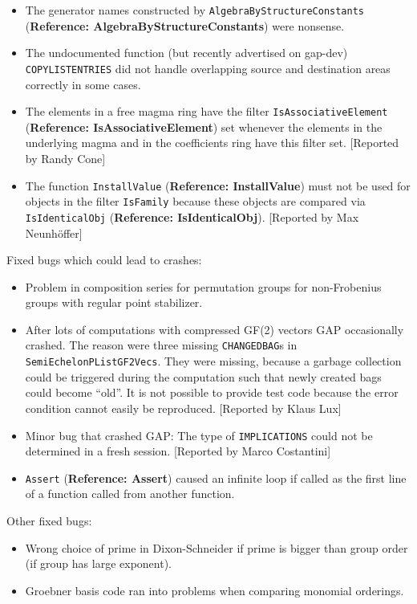 \documentclass[a4paper,11pt]{report}
\begin{document}
{{\begin{itemize}
was available. [Reported by Burkhard H{\"o}fling] 
\item  The generator names constructed by \texttt{AlgebraByStructureConstants} (\textbf{Reference: AlgebraByStructureConstants}) were nonsense. 
\item  The undocumented function (but recently advertised on gap-dev) \texttt{COPY{\textunderscore}LIST{\textunderscore}ENTRIES} did not handle overlapping source and destination areas correctly in some
cases. 
\item  The elements in a free magma ring have the filter \texttt{IsAssociativeElement} (\textbf{Reference: IsAssociativeElement}) set whenever the elements in the underlying magma and in the coefficients ring
have this filter set. [Reported by Randy Cone] 
\item  The function \texttt{InstallValue} (\textbf{Reference: InstallValue}) must not be used for objects in the filter \texttt{IsFamily} because these objects are compared via \texttt{IsIdenticalObj} (\textbf{Reference: IsIdenticalObj}). [Reported by Max Neunh{\"o}ffer] 
\end{itemize}
 Fixed bugs which could lead to crashes: 
\begin{itemize}
\item  Problem in composition series for permutation groups for non-Frobenius groups
with regular point stabilizer. 
\item  After lots of computations with compressed GF(2) vectors \textsf{GAP} occasionally crashed. The reason were three missing \texttt{CHANGED{\textunderscore}BAG}s in \texttt{SemiEchelonPListGF2Vecs}. They were missing, because a garbage collection could be triggered during
the computation such that newly created bags could become ``old''. It is not possible to provide test code because the error condition cannot
easily be reproduced. [Reported by Klaus Lux] 
\item  Minor bug that crashed \textsf{GAP}: The type of \texttt{IMPLICATIONS} could not be determined in a fresh session. [Reported by Marco Costantini] 
\item  \texttt{Assert} (\textbf{Reference: Assert}) caused an infinite loop if called as the first line of a function called from
another function. 
\end{itemize}
 Other fixed bugs: 
\begin{itemize}
\item  Wrong choice of prime in Dixon-Schneider if prime is bigger than group order
(if group has large exponent). 
\item  Groebner basis code ran into problems when comparing monomial orderings. 

\end{itemize}}}
\end{document}
